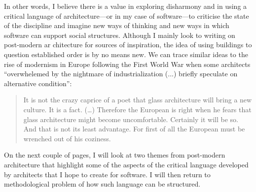 In other words, I believe there is a value in exploring disharmony and in using a critical language of architecture---or in my case of software---to
criticise the state of the discipline and imagine new ways of thinking and new ways in which
software can support social structures. Although I mainly look to writing on post-modern ar
chitecture for sources of inspiration, the idea of using buildings to question established order
is by no means new. We can trace similar ideas to the rise of modernism in Europe following
the First World War when some architects ``overwhelemed by the nightmare of industrialization
(...) briefly speculate on alternative condition'':

\begin{quote}
It is not the crazy caprice of a poet that glass architecture will bring a new culture.
It is a fact. (\ldots) Therefore the European is right when he fears that glass architecture
might become uncomfortable. Certainly it will be so. And that is not its least advantage.
For first of all the European must be wrenched out of his coziness.
\end{quote}

On the next couple of pages, I will look at two themes from post-modern architecture that
highlight some of the aspects of the critical language developed by architects that I hope
to create for software. I will then return to methodological problem of how such language
can be structured.


